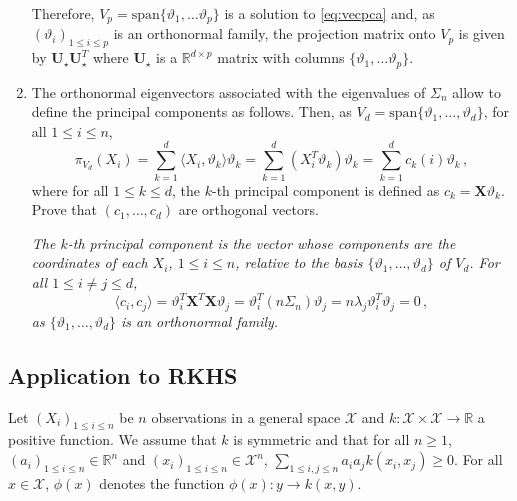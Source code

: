 \documentclass[a4paper,10pt,fleqn]{article}
\newcommand{\eqsp}{\,}
\newcommand{\rset}{\ensuremath{\mathbb{R}}}
\newcommand{\X}{\ensuremath{\mathcal{X}}}
\newcommand{\1}{\ensuremath{\mathbbm{1}}}
\newcommand{\bfU}{\mathbf{U}}
\newcommand{\bfX}{\mathbf{X}}
\newcommand{\bfs}{\mathbf{\Sigma}}
\begin{document}
\begin{enumerate}
{Therefore, $V_p = \mathrm{span}\{\vartheta_1,\ldots\vartheta_p\}$ is a solution to \eqref{eq:vecpca} and, as $(\vartheta_i)_{1\leqslant i \leqslant p}$ is an orthonormal family, the projection matrix onto $V_p$ is given by $\bfU_{\star}\bfU^T_{\star}$ where $\bfU_{\star}$ is a $\rset^{d\times p}$ matrix with columns $\{\vartheta_1,\ldots\vartheta_p\}$.
}
\item The orthonormal eigenvectors associated with the eigenvalues of $\Sigma_n$ allow to define the principal components as follows. Then, as $V_d = \mathrm{span}\{\vartheta_1, \ldots, \vartheta_d\}$, for all $1\leqslant i\leqslant n$,
$$
\pi_{V_d}(X_i) = \sum_{k=1}^d \langle X_i,\vartheta_k\rangle \vartheta_k  = \sum_{k=1}^d (X^T_i \vartheta_k)\vartheta_k = \sum_{k=1}^d c_k(i)\vartheta_k\eqsp,
$$
where for all $1\leqslant k \leqslant d$, the $k$-th principal component is defined as $c_k = \mathbf{X}\vartheta_k$. Prove that $(c_1,\ldots,c_d)$ are orthogonal vectors.

\vspace{.2cm}

{\em
The $k$-th principal component is the vector whose components are the coordinates of each $X_i$, $1\leqslant i\leqslant n$, relative to the basis $\{\vartheta_1, \ldots, \vartheta_d\}$ of $V_d$. For all $1\leqslant i\neq j \leqslant d$,
$$
\langle c_i,c_j\rangle = \vartheta^T_i \bfX^T \bfX \vartheta_j = \vartheta^T_i(n\Sigma_n)\vartheta_j = n \lambda_j \vartheta^T_i\vartheta_j = 0\eqsp,
$$
as $\{\vartheta_1, \ldots, \vartheta_d\}$ is an orthonormal family.
}
\end{enumerate}


\subsection*{Application to RKHS}
Let $(X_i)_{1\le i \le n}$ be $n$ observations in a general space $\X$ and $k: \X\times \X \to \rset$ a positive function. We assume that $k$ is symmetric and that for all $n\geqslant 1$, $(a_i)_{1\leqslant i \leqslant n}\in\rset^n$ and $(x_i)_{1\leqslant i \leqslant n}\in\X^n$, $\sum_{1\leqslant i,j \leqslant n}a_ia_j k(x_i,x_j)\geqslant 0$.  For all $x\in\X$, $\phi(x)$ denotes the function $\phi(x): y\to k(x,y)$.
\end{document}
